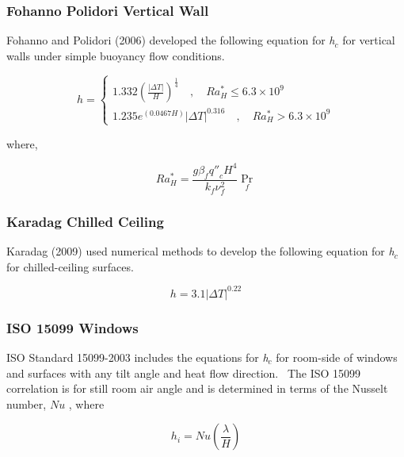 \subsubsection{Fohanno Polidori Vertical Wall}\label{fohanno-polidori-vertical-wall}

Fohanno and Polidori (2006) developed the following equation for \emph{h\(_{c}\)} for vertical walls under simple buoyancy flow conditions.

\begin{equation}
h = \left\{ \begin{array}{l}1.332{\left( {\frac{{\left| {\Delta T} \right|}}{H}} \right)^{{\frac{1}{4}}}}\quad ,\quad Ra_H^* \le 6.3 \times {10^9}\\1.235{e^{\left( {0.0467H} \right)}}{\left| {\Delta T} \right|^{0.316}}\quad ,\quad Ra_H^* > 6.3 \times {10^9}\end{array} \right.
\end{equation}

where,

\begin{equation}
Ra_H^* = \frac{{g{\beta_f}{{q''}_c}{H^4}}}{{{k_f}\nu_f^2}}{\Pr_f}
\end{equation}

\subsubsection{Karadag Chilled Ceiling}\label{karadag-chilled-ceiling}

Karadag (2009) used numerical methods to develop the following equation for \emph{h\(_{c}\)} for chilled-ceiling surfaces.

\begin{equation}
h = 3.1{\left| {\Delta T} \right|^{0.22}}
\end{equation}

\subsubsection{ISO 15099 Windows}\label{iso-15099-windows}

ISO Standard 15099-2003 includes the equations for \emph{h\(_{c}\)} for room-side of windows and surfaces with any tilt angle and heat flow direction.~ The ISO 15099 correlation is for still room air angle and is determined in terms of the Nusselt number, \(Nu\) , where

\begin{equation}
{h_i} = Nu\left( {\frac{\lambda }{H}} \right)
\end{equation}

